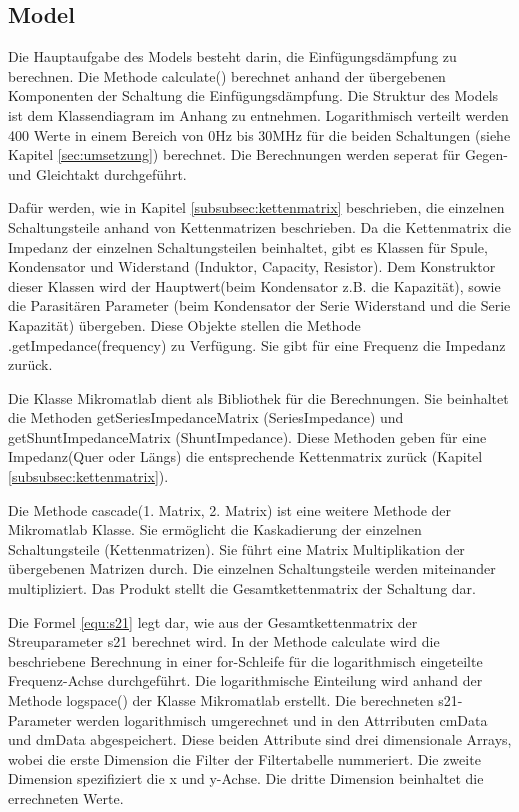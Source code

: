 \subsection{Model} \label{subsec:Model}

Die Hauptaufgabe des Models besteht darin, die Einfügungsdämpfung zu berechnen. Die Methode calculate() berechnet anhand der übergebenen Komponenten der Schaltung die Einfügungsdämpfung. Die Struktur des Models ist dem Klassendiagram im Anhang zu entnehmen. Logarithmisch verteilt werden 400 Werte in einem Bereich von 0Hz bis 30MHz für die beiden Schaltungen (siehe Kapitel \ref{sec:umsetzung}) berechnet. Die Berechnungen werden seperat für Gegen- und Gleichtakt durchgeführt.

Dafür werden, wie in Kapitel \ref{subsubsec:kettenmatrix} beschrieben, die einzelnen Schaltungsteile anhand von Kettenmatrizen beschrieben. Da die Kettenmatrix die Impedanz der einzelnen Schaltungsteilen beinhaltet, gibt es Klassen für Spule, Kondensator und Widerstand (Induktor, Capacity, Resistor). Dem Konstruktor dieser Klassen wird der Hauptwert(beim Kondensator z.B. die Kapazität), sowie die Parasitären Parameter (beim Kondensator der Serie Widerstand und die Serie Kapazität) übergeben. Diese Objekte stellen die Methode .getImpedance(frequency) zu Verfügung. Sie gibt für eine Frequenz die Impedanz zurück.

Die Klasse Mikromatlab dient als Bibliothek für die Berechnungen. Sie beinhaltet die Methoden getSeriesImpedanceMatrix (SeriesImpedance) und getShuntImpedanceMatrix (ShuntImpedance). Diese Methoden geben für eine Impedanz(Quer oder Längs) die entsprechende Kettenmatrix zurück (Kapitel \ref{subsubsec:kettenmatrix}).

Die Methode cascade(1. Matrix, 2. Matrix) ist eine weitere Methode der Mikromatlab Klasse. Sie ermöglicht die Kaskadierung der einzelnen Schaltungsteile (Kettenmatrizen). Sie führt eine Matrix Multiplikation der übergebenen Matrizen durch. Die einzelnen Schaltungsteile werden miteinander multipliziert. Das Produkt stellt die Gesamtkettenmatrix der Schaltung dar. 

Die Formel \ref{equ:s21} legt dar, wie aus der Gesamtkettenmatrix der Streuparameter s21 berechnet wird. In der Methode calculate wird die beschriebene Berechnung in einer for-Schleife für die logarithmisch eingeteilte Frequenz-Achse durchgeführt. Die logarithmische Einteilung wird anhand der Methode logspace() der Klasse Mikromatlab erstellt. Die berechneten s21-Parameter werden logarithmisch umgerechnet und in den Attrributen cmData und dmData abgespeichert. Diese beiden Attribute sind drei dimensionale Arrays, wobei die erste Dimension die Filter der Filtertabelle nummeriert. Die zweite Dimension spezifiziert die x und y-Achse. Die dritte Dimension beinhaltet die errechneten Werte. 

